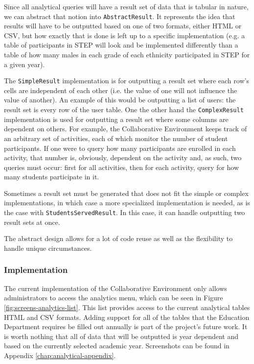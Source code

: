 Since all analytical queries will have a result set of data that is tabular in nature, we can abstract that notion into \texttt{AbstractResult}. It represents the idea that results will have to be outputted based on one of two formats, either HTML or CSV, but how exactly that is done is left up to a specific implementation (e.g. a table of participants in STEP will look and be implemented differently than a table of how many males in each grade of each ethnicity participated in STEP for a given year).

The \texttt{SimpleResult} implementation is for outputting a result set where each row's cells are independent of each other (i.e. the value of one will not influence the value of another). An example of this would be outputting a list of users: the result set is every row of the user table. One the other hand the \texttt{ComplexResult} implementation is used for outputting a result set where some columns are dependent on others. For example, the Collaborative Environment keeps track of an arbitrary set of activities, each of which monitor the number of student participants. If one were to query how many participants are enrolled in each activity, that number is, obviously, dependent on the activity and, as such, two queries must occur: first for all activities, then for each activity, query for how many students participate in it.

Sometimes a result set must be generated that does not fit the simple or complex implementations, in which case a more specialized implementation is needed, as is the case with \texttt{StudentsServedResult}. In this case, it can handle outputting two result sets at once.

The abstract design allows for a lot of code reuse as well as the flexibility to handle unique circumstances.

\subsubsection{Implementation}
The current implementation of the Collaborative Environment only allows administrators to access the analytics menu, which can be seen in Figure \ref{fig:screens-analytics-list}. This list provides access to the current analytical tables HTML and CSV formats. Adding support for all of the tables that the Education Department requires be filled out annually is part of the project's future work. It is worth nothing that all of data that will be outputted is year dependent and based on the currently selected academic year. Screenshots can be found in Appendix \ref{chap:analytical-appendix}.

